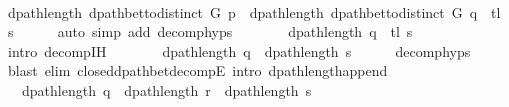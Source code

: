 \begin{isabellebody}
\ \ \isamarkupfalse%
\ {\isachardoublequoteopen}dpath{\isacharunderscore}{\kern0pt}length\ {\isacharparenleft}{\kern0pt}dpath{\isacharunderscore}{\kern0pt}bet{\isacharunderscore}{\kern0pt}to{\isacharunderscore}{\kern0pt}distinct\ G\ p{\isacharparenright}{\kern0pt}\ {\isacharequal}{\kern0pt}\ dpath{\isacharunderscore}{\kern0pt}length\ {\isacharparenleft}{\kern0pt}dpath{\isacharunderscore}{\kern0pt}bet{\isacharunderscore}{\kern0pt}to{\isacharunderscore}{\kern0pt}distinct\ G\ {\isacharparenleft}{\kern0pt}q\ {\isacharat}{\kern0pt}\ tl\ s{\isacharparenright}{\kern0pt}{\isacharparenright}{\kern0pt}{\isachardoublequoteclose}\isanewline
\ \ \ \ \isamarkupfalse%
\ {\isacharparenleft}{\kern0pt}auto\ simp\ add{\isacharcolon}{\kern0pt}\ decomp{\isachardot}{\kern0pt}hyps{\isacharparenleft}{\kern0pt}{}{\isacharparenright}{\kern0pt}{\isacharparenright}{\kern0pt}\isanewline
\ \ \isamarkupfalse%
\ \isamarkupfalse%
\ {\isachardoublequoteopen}{\isachardot}{\kern0pt}{\isachardot}{\kern0pt}{\isachardot}{\kern0pt}\ {\isasymle}\ dpath{\isacharunderscore}{\kern0pt}length\ {\isacharparenleft}{\kern0pt}q\ {\isacharat}{\kern0pt}\ tl\ s{\isacharparenright}{\kern0pt}{\isachardoublequoteclose}\isanewline
\ \ \ \ \isamarkupfalse%
\ {\isacharparenleft}{\kern0pt}intro\ decomp{\isachardot}{\kern0pt}IH{\isacharparenright}{\kern0pt}\isanewline
\ \ \isamarkupfalse%
\ \isamarkupfalse%
\ {\isachardoublequoteopen}{\isachardot}{\kern0pt}{\isachardot}{\kern0pt}{\isachardot}{\kern0pt}\ {\isacharequal}{\kern0pt}\ dpath{\isacharunderscore}{\kern0pt}length\ q\ {\isacharplus}{\kern0pt}\ dpath{\isacharunderscore}{\kern0pt}length\ s{\isachardoublequoteclose}\isanewline
\ \ \ \ \isamarkupfalse%
\ decomp{\isachardot}{\kern0pt}hyps\isanewline
\ \ \ \ \isamarkupfalse%
\ {\isacharparenleft}{\kern0pt}blast\ elim{\isacharcolon}{\kern0pt}\ closed{\isacharunderscore}{\kern0pt}dpath{\isacharunderscore}{\kern0pt}bet{\isacharunderscore}{\kern0pt}decompE{\isacharunderscore}{\kern0pt}{}\ intro{\isacharcolon}{\kern0pt}\ dpath{\isacharunderscore}{\kern0pt}length{\isacharunderscore}{\kern0pt}append{\isacharunderscore}{\kern0pt}{}{\isacharparenright}{\kern0pt}\isanewline
\ \ \isamarkupfalse%
\ \isamarkupfalse%
\ {\isachardoublequoteopen}{\isachardot}{\kern0pt}{\isachardot}{\kern0pt}{\isachardot}{\kern0pt}\ {\isasymle}\ dpath{\isacharunderscore}{\kern0pt}length\ q\ {\isacharplus}{\kern0pt}\ dpath{\isacharunderscore}{\kern0pt}length\ r\ {\isacharplus}{\kern0pt}\ dpath{\isacharunderscore}{\kern0pt}length\ s{\isachardoublequoteclose}\isanewline

\end{isabellebody}
